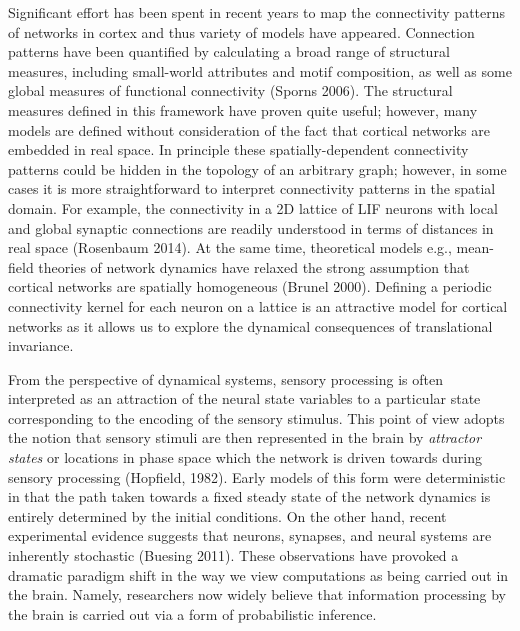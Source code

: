 \documentclass{ucetd}
\begin{document}
Significant effort has been spent in recent years to map the connectivity patterns of networks in cortex and thus variety of models have appeared. Connection patterns have been quantified by calculating a broad range of structural measures, including small-world attributes and motif composition, as well as some global measures of functional connectivity (Sporns 2006). The structural measures defined in this framework have proven quite useful; however, many models are defined without consideration of the fact that cortical networks are embedded in real space. In principle these spatially-dependent connectivity patterns could be hidden in the topology of an arbitrary graph; however, in some cases it is more straightforward to interpret connectivity patterns in the spatial domain. For example, the connectivity in a 2D lattice of LIF neurons with local and global synaptic connections are readily understood in terms of distances in real space (Rosenbaum 2014). At the same time, theoretical models e.g., mean-field theories of network dynamics have relaxed the strong assumption that cortical networks are spatially homogeneous (Brunel 2000). Defining a periodic connectivity kernel for each neuron on a lattice is an attractive model for cortical networks as it allows us to explore the dynamical consequences of translational invariance.

From the perspective of dynamical systems, sensory processing is often interpreted as an attraction of the neural state variables to a particular state corresponding to the encoding of the sensory stimulus. This point of view adopts the notion that sensory stimuli are then represented in the brain by \emph{attractor states} or locations in phase space which the network is driven towards during sensory processing (Hopfield, 1982). Early models of this form were deterministic in that the path taken towards a fixed steady state of the network dynamics is entirely determined by the initial conditions. On the other hand, recent experimental evidence suggests that neurons, synapses, and neural systems are inherently stochastic (Buesing 2011). These observations have provoked a dramatic paradigm shift in the way we view computations as being carried out in the brain. Namely, researchers now widely believe that information processing by the brain is carried out via a form of probabilistic inference.
\end{document}
